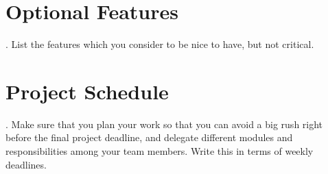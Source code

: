 \documentclass[11pt, a4paper]{article}
\begin{document}
\section{Optional Features}{. List the features which you consider to be nice to have, but not critical.}


\section{Project Schedule}{. Make sure that you plan your work so that you can avoid a big rush right before the final project deadline, and delegate different modules and responsibilities among your team members. Write this in terms of weekly deadlines.}
\end{document}
